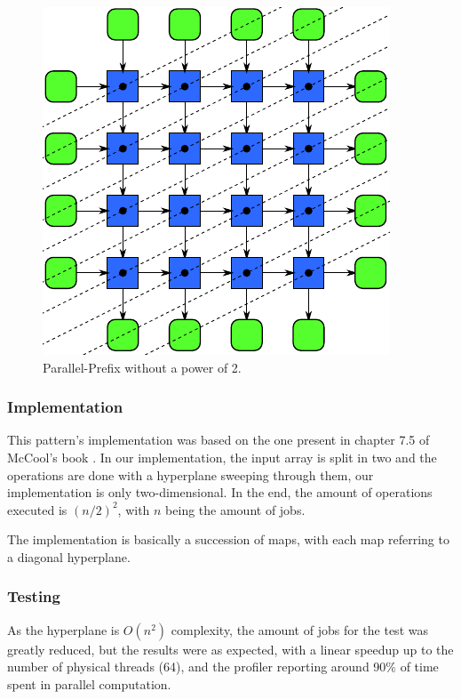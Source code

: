 \documentclass[10pt,journal]{IEEEtran}
\begin{document}
\begin{figure}[htbp]
	\centerline{\includegraphics[scale=0.25]{img/recurrence.png}}
	\caption{ Parallel-Prefix without a power of 2. }
	\label{parprefix}
\end{figure}

\subsubsection{Implementation}

This pattern's implementation was based on the one present in chapter 7.5 of McCool's book \cite{mccool}. In our implementation, the input array is split in two and the operations are done with a hyperplane sweeping through them, our implementation is only two-dimensional. In the end, the amount of operations executed is $ (n / 2)^2 $, with $ n $ being the amount of jobs. 

The implementation is basically a succession of maps, with each map referring to a diagonal hyperplane. 

\subsubsection{Testing}

As the hyperplane is $ O(n^2) $ complexity, the amount of jobs for the test was greatly reduced, but the results were as expected, with a linear speedup up to the number of physical threads (64), and the profiler reporting around 90\% of time spent in parallel computation.

\end{document}
